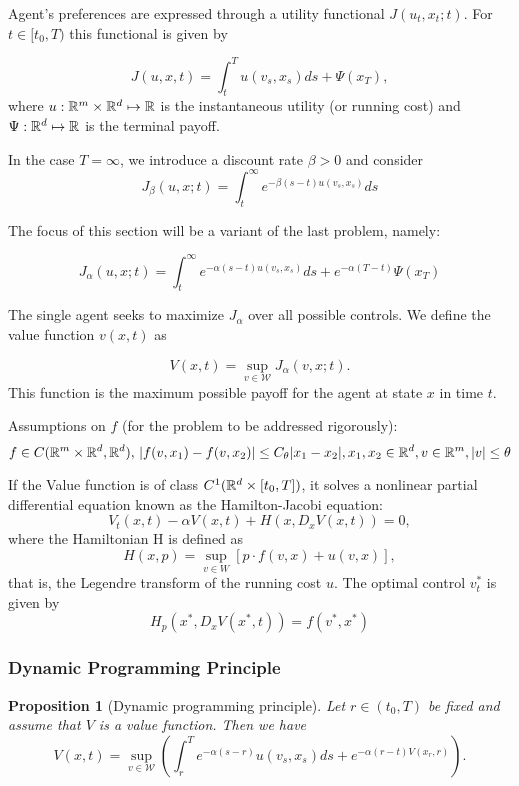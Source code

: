 \documentclass{article}
\newtheorem{proposition}{Proposition}
\begin{document}
Agent's preferences are expressed through a utility functional $J(u_t, x_t; t)$. For $t \in [t_0,T)$ this functional is given by 

$$
J(u,x,t) = \int_t^T u(v_s, x_s) ds + \Psi(x_T),
$$
where $u : \mathbb{R}^m\times \mathbb{R}^d \mapsto \mathbb{R}$ is the instantaneous utility (or running cost) and $\Psi : \mathbb{R}^d \mapsto \mathbb{R}$ is the terminal payoff.

In the case $T = \infty$, we introduce a discount rate $\beta > 0$ and consider
$$
J_\beta (u,x;t) = \int_t^\infty e^{-\beta (s - t) u(v_s, x_s)} ds 
$$

The focus of this section will be a variant of the last problem, namely:

$$
J_\alpha (u,x;t) = \int_t^\infty e^{-\alpha (s - t) u(v_s, x_s)} ds + e^{-\alpha (T -t)} \Psi(x_T) 
$$

The single agent seeks to maximize $J_\alpha$ over all possible controls.
We define the value function $v(x,t)$ as

$$
V(x,t) = \sup_{v\in \mathcal{W}} J_\alpha (v, x ; t).
$$
This function is the maximum possible payoff for the agent at state $x$ in time $t$.

Assumptions on $f$ (for the problem to be addressed rigorously):
$$f \in C(\mathbb{R}^m \times \mathbb{R}^d, \mathbb{R}^d),\, |f(v, x_1) - f(v, x_2)| \leq C_\theta |x_1 - x_2|, x_1, x_2 \in \mathbb{R}^d, v\in \mathbb{R}^m, |v| \leq \theta$$

If the Value function is of class $C^1(\mathbb{R}^d \times [t_0,T])$, it solves  a nonlinear partial differential equation known as the Hamilton-Jacobi equation:
$$V_t(x,t) - \alpha V(x,t) + H(x,D_x V(x,t)) = 0,$$
where the Hamiltonian H is defined as 
$$H(x,p) = \sup_{v\in W} [p \cdot f(v,x) + u(v,x)],$$
that is, the Legendre transform of the running cost $u$.
The optimal control $v_t^*$ is given by 
$$ H_p (x^*, D_x V(x^*,t)) = f(v^*, x^*)$$

\subsubsection{Dynamic Programming Principle}

\begin{proposition}[Dynamic programming principle]
    Let $r \in (t_0, T)$ be fixed and assume that $V$ is a value function. Then we have
    $$
    V(x,t) = \sup_{v\in \mathcal{W}} \left( \int_r^T e^{-\alpha (s-r)} u(v_s,x_s) ds + e^{-\alpha (r - t) V(x_r,r)} \right).
    $$
\end{proposition}
\end{document}
